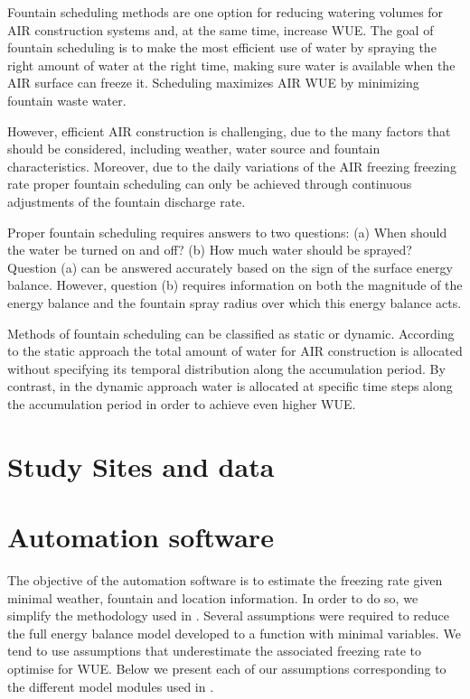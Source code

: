 \documentclass[utf8]{frontiersSCNS}
\begin{document}
Fountain scheduling methods are one option for reducing watering volumes for AIR construction systems and, at
the same time, increase WUE. The goal of fountain scheduling is to make the most efficient use of water by
spraying the right amount of water at the right time, making sure water is available when the AIR surface can
freeze it. Scheduling maximizes AIR WUE by minimizing fountain waste water.  

However, efficient AIR construction is challenging, due to the many factors that should be considered, including
weather, water source and fountain characteristics. Moreover, due to the daily variations of the AIR freezing
freezing rate proper fountain scheduling can only be achieved through continuous adjustments of the fountain
discharge rate. 

Proper fountain scheduling requires answers to two questions: (a) When should the water be turned on and off?
(b) How much water should be sprayed? Question (a) can be answered accurately based on the sign of the surface
energy balance. However, question (b) requires information on both the magnitude of the energy balance and the
fountain spray radius over which this energy balance acts.  

Methods of fountain scheduling can be classified as static or dynamic. According to the static approach the
total amount of water for AIR construction is allocated without specifying its temporal distribution along the
accumulation period. By contrast, in the dynamic approach water is allocated at specific time steps along the
accumulation period in order to achieve even higher WUE.

\section{Study Sites and data}

\section{Automation software}
The objective of the automation software is to estimate the freezing rate given minimal weather, fountain and
location information. In order to do so, we simplify the methodology used in \cite{Balasubramanian_2022}.
Several assumptions were required to reduce the full energy balance model developed to a function with minimal
variables. We tend to use assumptions that underestimate the associated freezing rate to optimise for WUE. Below
we present each of our assumptions corresponding to the different model modules used in
\cite{Balasubramanian_2022}. 
\end{document}
